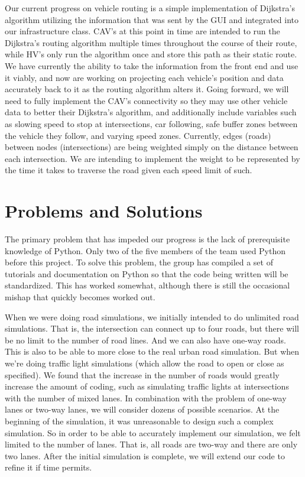 \documentclass[onecolumn, draftclsnofoot,10pt, compsoc]{IEEEtran}
\begin{document}
Our current progress on vehicle routing is a simple implementation of Dijkstra’s algorithm utilizing the information that was sent by the GUI and integrated into our infrastructure class. CAV’s at this point in time are intended to run the Dijkstra’s routing algorithm multiple times throughout the course of their route, while HV’s only run the algorithm once and store this path as their static route. We have currently the ability to take the information from the front end and use it viably, and now are working on projecting each vehicle’s position and data accurately back to it as the routing algorithm alters it. Going forward, we will need to fully implement the CAV’s connectivity so they may use other vehicle data to better their Dijkstra’s algorithm, and additionally include variables such as slowing speed to stop at intersections, car following, safe buffer zones between the vehicle they follow, and varying speed zones. Currently, edges (roads) between nodes (intersections) are being weighted simply on the distance between each intersection. We are intending to implement the weight to be represented by the time it takes to traverse the road given each speed limit of such.
\section{Problems and Solutions}
The primary problem that has impeded our progress is the lack of prerequisite knowledge of Python. Only two of the five members of the team used Python before this project. To solve this problem, the group has compiled a set of tutorials and documentation on Python so that the code being written will be standardized. This has worked somewhat, although there is still the occasional mishap that quickly becomes worked out.

When we were doing road simulations, we initially intended to do unlimited road simulations. That is, the intersection can connect up to four roads, but there will be no limit to the number of road lines. And we can also have one-way roads. This is also to be able to more close to the real urban road simulation. But when we're doing traffic light simulations (which allow the road to open or close as specified). We found that the increase in the number of roads would greatly increase the amount of coding, such as simulating traffic lights at intersections with the number of mixed lanes. In combination with the problem of one-way lanes or two-way lanes, we will consider dozens of possible scenarios. At the beginning of the simulation, it was unreasonable to design such a complex simulation. So in order to be able to accurately implement our simulation, we felt limited to the number of lanes. That is, all roads are two-way and there are only two lanes. After the initial simulation is complete, we will extend our code to refine it if time permits.
\end{document}

